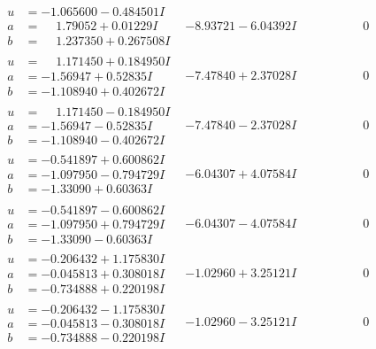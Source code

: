 \documentclass[1p]{elsarticle_modified}
\theoremstyle{definition}
\begin{document}
$$\begin{array}{c|c|c}
 \hline 
\begin{aligned}
u &= -1.065600 - 0.484501 I \\
a &= \phantom{-}1.79052 + 0.01229 I \\
b &= \phantom{-}1.237350 + 0.267508 I\end{aligned}
 & -8.93721 - 6.04392 I & \phantom{-0.000000 } 0 \\ \hline\begin{aligned}
u &= \phantom{-}1.171450 + 0.184950 I \\
a &= -1.56947 + 0.52835 I \\
b &= -1.108940 + 0.402672 I\end{aligned}
 & -7.47840 + 2.37028 I & \phantom{-0.000000 } 0 \\ \hline\begin{aligned}
u &= \phantom{-}1.171450 - 0.184950 I \\
a &= -1.56947 - 0.52835 I \\
b &= -1.108940 - 0.402672 I\end{aligned}
 & -7.47840 - 2.37028 I & \phantom{-0.000000 } 0 \\ \hline\begin{aligned}
u &= -0.541897 + 0.600862 I \\
a &= -1.097950 - 0.794729 I \\
b &= -1.33090 + 0.60363 I\end{aligned}
 & -6.04307 + 4.07584 I & \phantom{-0.000000 } 0 \\ \hline\begin{aligned}
u &= -0.541897 - 0.600862 I \\
a &= -1.097950 + 0.794729 I \\
b &= -1.33090 - 0.60363 I\end{aligned}
 & -6.04307 - 4.07584 I & \phantom{-0.000000 } 0 \\ \hline\begin{aligned}
u &= -0.206432 + 1.175830 I \\
a &= -0.045813 + 0.308018 I \\
b &= -0.734888 + 0.220198 I\end{aligned}
 & -1.02960 + 3.25121 I & \phantom{-0.000000 } 0 \\ \hline\begin{aligned}
u &= -0.206432 - 1.175830 I \\
a &= -0.045813 - 0.308018 I \\
b &= -0.734888 - 0.220198 I\end{aligned}
 & -1.02960 - 3.25121 I & \phantom{-0.000000 } 0 \\ \hline\begin{aligned}

\end{aligned}
\end{array}$$
\end{document}
